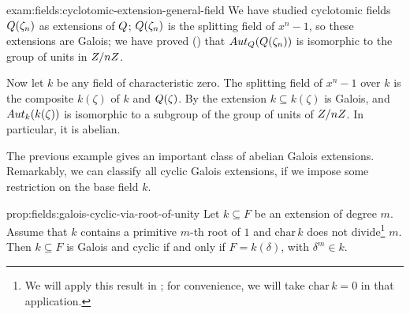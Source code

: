 \begin{exam}{}{exam:fields:cyclotomic-extension-general-field}
  We have studied cyclotomic fields $Q(\zeta_n)$ as extensions of
  $Q$; $Q(\zeta_n)$ is the splitting field of $x^n - 1$, so these
  extensions are Galois; we have proved () that
  $Aut_{Q}(Q(\zeta_n))$ is isomorphic to the group of units in
  $Z/nZ$.

  Now let $k$ be any field of characteristic zero. The splitting field
  of $x^n - 1$ over $k$ is the composite $k(\zeta)$ of $k$ and
  $Q(\zeta)$.  By  the extension
  $k \subseteq k(\zeta)$ is Galois, and $Aut_k(k(\zeta))$ is
  isomorphic to a subgroup of the group of units of $Z/nZ$. In
  particular, it is abelian.
\end{exam}
The previous example gives an important class of abelian Galois
extensions. Remarkably, we can classify all cyclic Galois extensions,
if we impose some restriction on the base field $k$.

\begin{prop}{}{prop:fields:galois-cyclic-via-root-of-unity}
  Let $k \subseteq F$ be an extension of degree $m$. Assume that $k$
  contains a primitive $m$-th root of $1$ and $\mathrm{char}\,k$ does
  not divide\footnote{We will apply this result in
    ;
    for convenience, we will take $\mathrm{char}\,k = 0$ in that
    application.} $m$. Then $k \subseteq F$ is Galois and cyclic if
  and only if $F = k(\delta)$, with $\delta^m \in k$.
\end{prop}

